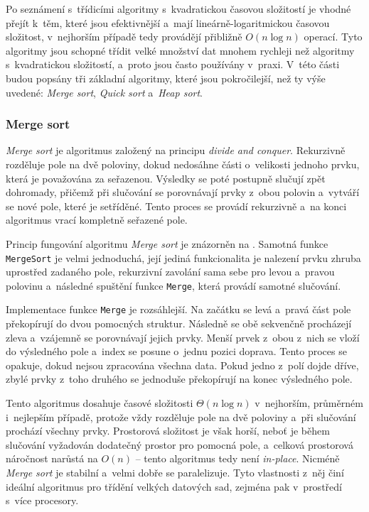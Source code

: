 Po seznámení s~třídicími algoritmy s~kvadratickou časovou složitostí je vhodné přejít k~těm, které jsou efektivnější a~mají lineárně-logaritmickou časovou složitost, v~nejhorším případě tedy provádějí přibližně $O(n \log n)$ operací.
Tyto algoritmy jsou schopné třídit velké množství dat mnohem rychleji než algoritmy s~kvadratickou složitostí, a~proto jsou často používány v~praxi.
V~této části budou popsány tři základní algoritmy, které jsou pokročilejší, než ty výše uvedené: \textit{Merge sort}, \textit{Quick sort} a~\textit{Heap sort}.

\subsubsection*{Merge sort}

\textit{Merge sort} je algoritmus založený na principu \textit{divide and conquer}.
Rekurzivně rozděluje pole na dvě poloviny, dokud nedosáhne části o~velikosti jednoho prvku, která je považována za seřazenou.
Výsledky se poté postupně slučují zpět dohromady, přičemž při slučování se porovnávají prvky z~obou polovin a~vytváří se nové pole, které je setříděné.
Tento proces se provádí rekurzivně a~na konci algoritmus vrací kompletně seřazené pole.~\cite{levitin}

Princip fungování algoritmu \textit{Merge sort} je znázorněn na .
Samotná funkce \texttt{MergeSort} je velmi jednoduchá, její jediná funkcionalita je nalezení prvku zhruba uprostřed zadaného pole, rekurzivní zavolání sama sebe pro levou a~pravou polovinu a~následné spuštění funkce \texttt{Merge}, která provádí samotné slučování.

Implementace funkce \texttt{Merge} je rozsáhlejší.
Na začátku se levá a~pravá část pole překopírují do dvou pomocných struktur.
Následně se obě sekvenčně procházejí zleva a~vzájemně se porovnávají jejich prvky.
Menší prvek z~obou z~nich se vloží do výsledného pole a~index se posune o~jednu pozici doprava.
Tento proces se opakuje, dokud nejsou zpracována všechna data.
Pokud jedno z~polí dojde dříve, zbylé prvky z~toho druhého se jednoduše překopírují na konec výsledného pole.

\begin{listing}[H]
    
    \caption{Pseudokód algoritmu Merge sort}
    \label{lst:mergeSort}
\end{listing}

Tento algoritmus dosahuje časové složitosti $\Theta(n \log n)$ v~nejhorším, průměrném i~nejlepším případě, protože vždy rozděluje pole na dvě poloviny a~při slučování prochází všechny prvky.
Prostorová složitost je však horší, neboť je během slučování vyžadován dodatečný prostor pro pomocná pole, a~celková prostorová náročnost narůstá na $O(n)$ -- tento algoritmus tedy není \textit{in-place}.
Nicméně \textit{Merge sort} je stabilní a~velmi dobře se paralelizuje.
Tyto vlastnosti z~něj činí ideální algoritmus pro třídění velkých datových sad, zejména pak v~prostředí s~více procesory.~\cite{morin2013}

